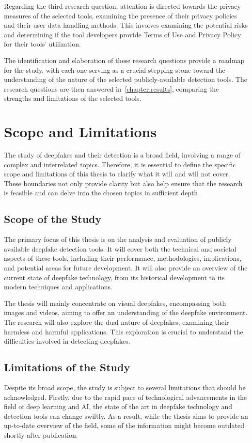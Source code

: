 Regarding the third research question, attention is directed towards the privacy measures of the
selected tools, examining the presence of their privacy policies and their user data handling
methods. This involves examining the potential risks and determining if the tool developers
provide Terms of Use and Privacy Policy for their tools' utilization.

The identification and elaboration of these research questions provide a roadmap for the study,
with each one serving as a crucial stepping-stone toward the understanding of the nature of
the selected publicly-available detection tools. The research questions are then answered in~\autoref{chapter:results},
comparing the strengths and limitations of the selected tools.

\section{Scope and Limitations}\label{chapter:scope}
The study of deepfakes and their detection is a broad field, involving a range of complex and
interrelated topics. Therefore, it is essential to define the specific scope and
limitations of this thesis to clarify what it will and will not cover. These boundaries
not only provide clarity but also help ensure that the research is feasible and can delve
into the chosen topics in sufficient depth.

\subsection{Scope of the Study}
The primary focus of this thesis is on the analysis and evaluation of publicly available
deepfake detection tools. It will cover both the technical and societal aspects of these
tools, including their performance, methodologies, implications, and potential areas for
future development. It will also provide an overview of the current state of deepfake
technology, from its historical development to its modern techniques and applications.

The thesis will mainly concentrate on visual deepfakes, encompassing both images and
videos, aiming to offer an understanding of the deepfake environment. The
research will also explore the dual nature of deepfakes, examining their harmless
and harmful applications. This exploration is crucial to understand the
difficulties involved in detecting deepfakes.

\subsection{Limitations of the Study}
Despite its broad scope, the study is subject to several limitations that should be
acknowledged. Firstly, due to the rapid pace of technological advancements in the field
of deep learning and \ac{AI}, the state of the art in deepfake technology and detection tools
can change swiftly. As a result, while the thesis aims to provide an up-to-date overview
of the field, some of the information might become outdated shortly after publication.

